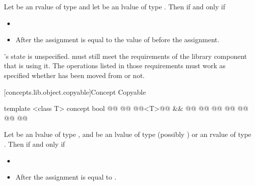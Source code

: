 \begin{addedblock}
\begin{itemdescr}
\pnum
Let  be an rvalue of type 
and let  be an lvalue of type . Then 
  if and only if

\begin{itemize}
\item {}
\item After the assignment   is equal to the value
of  before the assignment.
\end{itemize}

\pnum
{}'s  state is unspecified. \enternote {} must still meet the
requirements of the library component that is using it. The operations listed
in those requirements must work as specified whether  has been moved
from or not.\exitnote
\end{itemdescr}

[concepts.lib.object.copyable]{Concept Copyable}

%
\begin{itemdecl}
template <class T>
concept bool @@
  @@
    @@<T>@\newtxt{()}@ &&
    @@
    @@
      @@
      @@
      @@
    @\oldtxt{\};}@
@\newtxt{\}}@
\end{itemdecl}

\begin{itemdescr}
\pnum
Let  be an lvalue of type , and  be an lvalue of type (possibly
)  or an rvalue of type . Then 
  if and only if

\begin{itemize}
\item {}
\item After the assignment   is equal to .
\end{itemize}
\end{itemdescr}


\end{addedblock}
